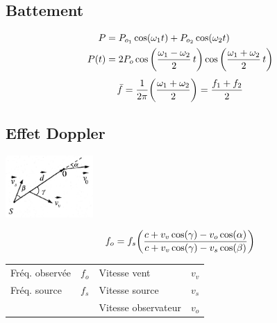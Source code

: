 \subsection{Battement}
\begin{align*}
    P&=P_{o_{1}}\cos(\omega_1 t)+P_{{o}_{2}}\cos(\omega_2 t)\\
    P(t)&=2P_{o}\cos\qty(\frac{\omega_1-\omega_2}{2}\,t)\cos\qty(\frac{\omega_1+\omega_2}{2}\,t)
\end{align*}
\[\bar{f}=\frac{1}{2\pi}\qty(\frac{\omega_1+\omega_2}{2})=\frac{f_1+f_2}{2}\]


\subsection{Effet Doppler}
\begin{center}
    \includegraphics[width=0.25\textwidth]{fig/doppler.PNG}    
\end{center}
\[f_{o}=f_{s}\qty(\frac{c+v_{v}\cos(\gamma)-v_{o}\cos(\alpha)}{c+v_{v}\cos(\gamma)-v_{s}\cos(\beta)})\]
\begin{tabular}{ll|ll}
    Fréq. observée & \(f_{o}\) & Vitesse vent & \(v_{v}\)  \\
    Fréq. source & \(f_{s}\) & Vitesse source & \(v_{s}\) \\
    & & Vitesse observateur & \(v_{o}\)
\end{tabular}